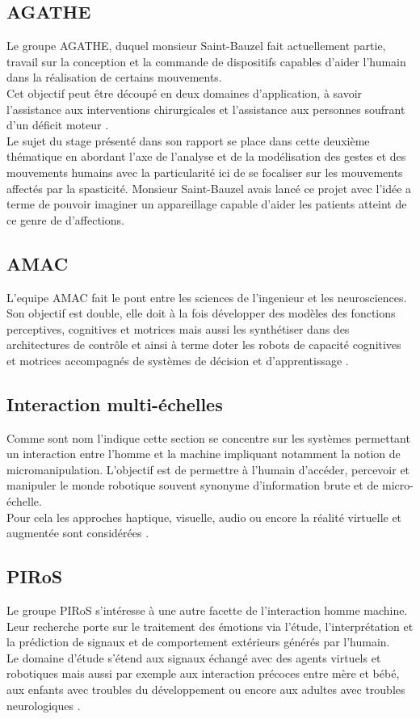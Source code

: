 \subsection*{AGATHE}
Le groupe AGATHE, duquel monsieur Saint-Bauzel fait actuellement partie, travail sur la conception et la commande de dispositifs capables d'aider l'humain dans la réalisation de certains mouvements.\\ 
Cet objectif peut être découpé en deux domaines d'application, à savoir l'assistance aux interventions chirurgicales et l'assistance aux personnes soufrant d'un déficit moteur \cite{noauthor_isir_nodate-3}.\\
Le sujet du stage présenté dans son rapport se place dans cette deuxième thématique en abordant l'axe de l'analyse et de la modélisation des gestes et des mouvements humains avec la particularité ici de se focaliser sur les mouvements affectés par la spasticité. Monsieur Saint-Bauzel avais lancé ce projet avec l'idée a terme de pouvoir imaginer un appareillage capable d'aider les patients atteint de ce genre de d'affections. 

\subsection*{AMAC}
L'equipe AMAC fait le pont entre les sciences de l'ingenieur et les neurosciences. Son objectif est double, elle doit à la fois développer des modèles des fonctions perceptives, cognitives et motrices mais aussi les synthétiser dans des architectures de contrôle et ainsi à terme doter les robots de capacité cognitives et motrices accompagnés de systèmes de décision et d'apprentissage \cite{noauthor_isir_nodate-4}. 

\subsection*{Interaction multi-échelles}
Comme sont nom l'indique cette section se concentre sur les systèmes permettant un interaction entre l'homme et la machine impliquant notamment la notion de micromanipulation. L'objectif est de permettre à l'humain d'accéder, percevoir et manipuler le monde robotique souvent synonyme d'information brute et de micro-échelle.\\
Pour cela les approches haptique, visuelle, audio ou encore la réalité virtuelle et augmentée sont considérées \cite{noauthor_isir_nodate-5}. 

\subsection*{PIRoS}
Le groupe PIRoS s'intéresse à une autre facette de l'interaction homme machine. Leur recherche porte sur le traitement des émotions via l'étude, l'interprétation et la prédiction de signaux et de comportement extérieurs générés par l'humain.\\
Le domaine d'étude s'étend aux signaux échangé avec des agents virtuels et robotiques mais aussi par exemple aux interaction précoces entre mère et bébé, aux enfants avec troubles du développement ou encore aux adultes avec troubles neurologiques \cite{noauthor_isir_nodate-6}.\\

